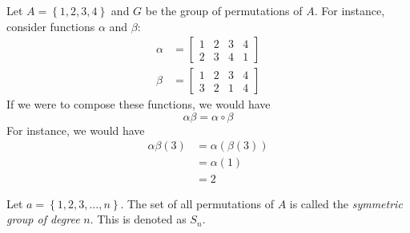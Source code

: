 \begin{nexample}
    Let \(A = \left\{1, 2, 3, 4\right\}\) and \(G\) be the group of permutations of \(A\). For instance, consider functions \(\alpha\) and \(\beta\):
    \[
    \begin{aligned}
        \alpha &= \begin{bmatrix}
            1 & 2 & 3 & 4 \\
            2 & 3 & 4 & 1
        \end{bmatrix} \\
        \beta &= \begin{bmatrix}
            1 & 2 & 3 & 4 \\
            3 & 2 & 1 & 4
        \end{bmatrix}
    \end{aligned}
    \]
    If we were to compose these functions, we would have
    \[
        \alpha \beta = \alpha \circ \beta
    \]
    For instance, we would have
    \[
    \begin{aligned}
        \alpha \beta(3) &= \alpha(\beta(3)) \\
                        &= \alpha(1) \\
                        &= 2
    \end{aligned}
    \]
\end{nexample}

\begin{definition}
    Let \(a = \left\{1, 2, 3, \ldots, n\right\}\). The set of all permutations of \(A\) is called the \textit{symmetric group of degree} \(n\). This is denoted as \(S_n\).
\end{definition}

